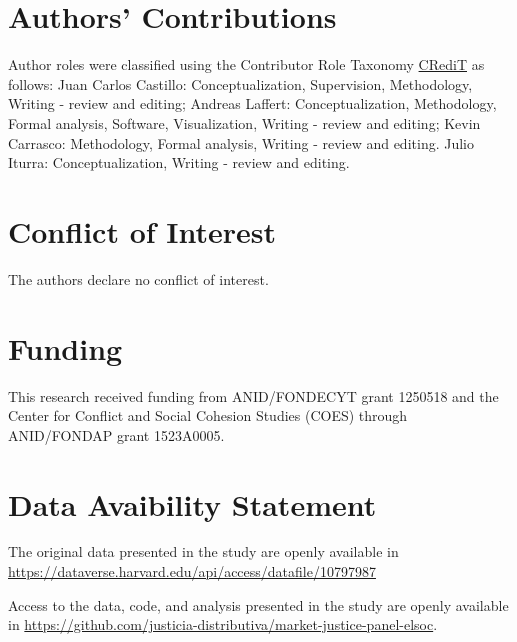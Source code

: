 \documentclass[
  12pt,
]{article}
\begin{document}
\hypertarget{authors-contributions}{%
\section{Authors' Contributions}\label{authors-contributions}}

Author roles were classified using the Contributor Role Taxonomy
\href{https://credit.niso.org/}{CRediT} as follows: Juan Carlos
Castillo: Conceptualization, Supervision, Methodology, Writing - review
and editing; Andreas Laffert: Conceptualization, Methodology, Formal
analysis, Software, Visualization, Writing - review and editing; Kevin
Carrasco: Methodology, Formal analysis, Writing - review and editing.
Julio Iturra: Conceptualization, Writing - review and editing.

\hypertarget{conflict-of-interest}{%
\section{Conflict of Interest}\label{conflict-of-interest}}

The authors declare no conflict of interest.

\hypertarget{funding}{%
\section{Funding}\label{funding}}

This research received funding from ANID/FONDECYT grant 1250518 and the
Center for Conflict and Social Cohesion Studies (COES) through
ANID/FONDAP grant 1523A0005.

\hypertarget{data-avaibility-statement}{%
\section{Data Avaibility Statement}\label{data-avaibility-statement}}

The original data presented in the study are openly available in
\url{https://dataverse.harvard.edu/api/access/datafile/10797987}

Access to the data, code, and analysis presented in the study are openly
available in
\url{https://github.com/justicia-distributiva/market-justice-panel-elsoc}.
\end{document}
